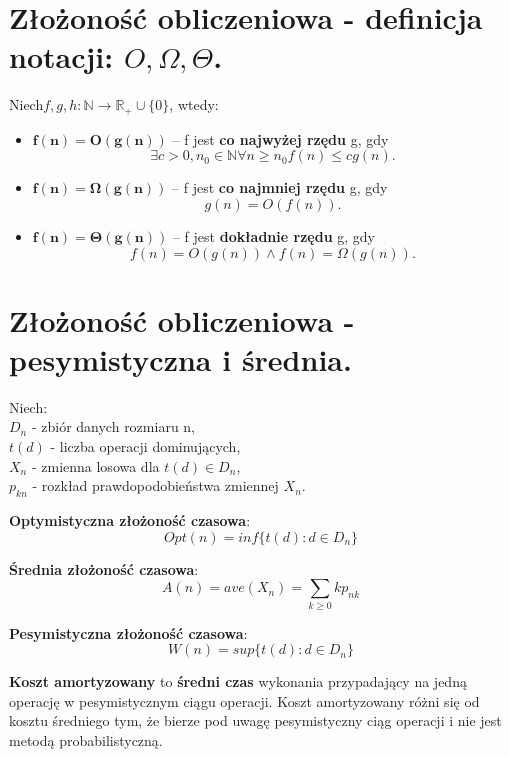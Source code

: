\documentclass[main.tex]{subfiles}
\begin{document}
    \section{Złożoność obliczeniowa - definicja notacji: $O, \Omega, \Theta$.}
    \begin{definition}
        Niech$f, g, h: \mathbb{N} \rightarrow \mathbb{R}_{+} \cup \{0\}$, wtedy:
        \begin{itemize}
            \item $\mathbf{f(n) = O(g(n))}$ -- f jest \textbf{co najwyżej rzędu} g, gdy
            \[\exists c > 0, n_0 \in \mathbb{N} \forall n \geq n_0 f(n) \leq cg(n).\]
            \item $\mathbf{f(n) = \Omega(g(n))}$ -- f jest \textbf{co najmniej rzędu} g, gdy
            \[g(n) = O(f(n)).\]
            \item $\mathbf{f(n) = \Theta(g(n))}$ -- f jest \textbf{dokładnie rzędu} g, gdy
            \[f(n) = O(g(n)) \wedge  f(n) = \Omega(g(n)).\]
        \end{itemize}
    \end{definition}


    \section{Złożoność obliczeniowa - pesymistyczna i średnia.}

    \begin{definition}
        Niech:\\
        $D_n$ - zbiór danych rozmiaru n,\\
        $t(d)$ - liczba operacji dominujących,\\
        $X_n$ - zmienna losowa dla $t(d) \in D_n$,\\
        $p_{kn}$ - rozkład prawdopodobieństwa zmiennej $X_n$.

        \textbf{Optymistyczna złożoność czasowa}:
        \[Opt(n) = inf\{t(d) : d \in D_n\}\]

        \textbf{Średnia złożoność czasowa}:
        \[A(n) = ave(X_n) = \sum_{k \geq 0}kp_{nk}\]

        \textbf{Pesymistyczna złożoność czasowa}:
        \[W(n) = sup\{t(d) : d \in D_n\}\]
    \end{definition}

    \begin{definition}
        \textbf{Koszt amortyzowany} to \textbf{średni czas} wykonania przypadający na jedną operację w pesymistycznym
        ciągu operacji. Koszt amortyzowany różni się od kosztu średniego tym, że bierze pod uwagę pesymistyczny ciąg
        operacji i nie jest metodą probabilistyczną.
    \end{definition}
\end{document}
